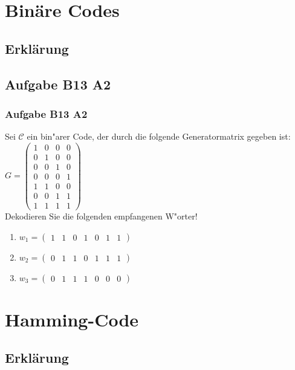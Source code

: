 \section{Binäre Codes}
\subsection{Erklärung}
\subsection{Aufgabe B13 A2}
\begin{frame}
\frametitle{Aufgabe B13 A2}
Sei $\mathcal{C}$ ein bin"arer Code, der durch die folgende Generatormatrix gegeben
ist:\\[4pt]
$G = \left( \begin{array}{cccc}
1 & 0 & 0 & 0 \\
0 & 1 & 0 & 0 \\
0 & 0 & 1 & 0 \\
0 & 0 & 0 & 1 \\
1 & 1 & 0 & 0 \\
0 & 0 & 1 & 1 \\
1 & 1 & 1 & 1
\end{array} \right)$\\[4pt]
Dekodieren Sie die folgenden empfangenen W"orter!
\begin{enumerate}
\item $w_1 = (\begin{array}{ccccccc}1 & 1 & 0 & 1 & 0 & 1 & 1\end{array})$
\item $w_2 = (\begin{array}{ccccccc}0 & 1 & 1 & 0 & 1 & 1 & 1\end{array})$
\item $w_3 = (\begin{array}{ccccccc}0 & 1 & 1 & 1 & 0 & 0 & 0\end{array})$
\end{enumerate}
\end{frame}


\section{Hamming-Code}
\subsection{Erklärung}
